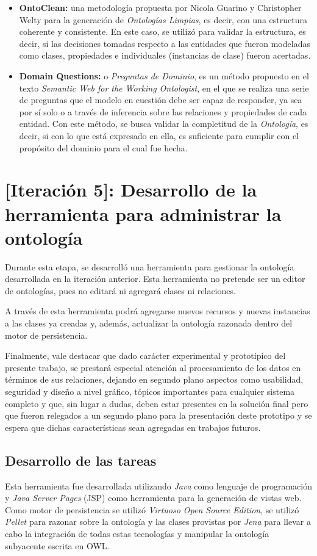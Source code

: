 \begin{itemize}
\begin{itemize}
    \item \textbf{OntoClean:} una metodología propuesta por Nicola Guarino y Christopher Welty para la generación de \textit{Ontologías Limpias}, es decir, con una estructura coherente y consistente. En este caso, se utilizó para validar la estructura, es decir, si las decisiones tomadas respecto a las entidades que fueron modeladas como clases, propiedades e individuales (instancias de clase) fueron acertadas.
    \item \textbf{Domain Questions:} o \textit{Preguntas de Dominio}, es un método propuesto en el texto \textit{Semantic Web for the Working Ontologist}, en el que se realiza una serie de preguntas que el modelo en cuestión debe ser capaz de responder, ya sea por sí solo o a través de inferencia sobre las relaciones y propiedades de cada entidad. Con este método, se busca validar la completitud de la \textit{Ontología}, es decir, si con lo que está expresado en ella, es suficiente para cumplir con el propósito del dominio para el cual fue hecha.
\end{itemize}

\section{[Iteración 5]: Desarrollo de la herramienta para administrar la ontología}
Durante esta etapa, se desarrolló una herramienta para gestionar la ontología desarrollada en la iteración anterior. Esta herramienta no pretende ser un editor de ontologías, pues no editará ni agregará clases ni relaciones.

A través de esta herramienta podrá agregarse nuevos recursos y nuevas instancias a las clases ya creadas y, además, actualizar la ontología razonada dentro del motor de persistencia. 

Finalmente, vale destacar que dado carácter experimental y prototípico del presente trabajo, se prestará especial atención al procesamiento de los datos en términos de sus relaciones, dejando en segundo plano aspectos como usabilidad, seguridad y diseño a nivel gráfico, tópicos importantes para cualquier sistema completo y que, sin lugar a dudas, deben estar presentes en la solución final pero que fueron relegados a un segundo plano para la presentación deste prototipo y se espera que dichas características sean agregadas en trabajos futuros.

\subsection{Desarrollo de las tareas}
Esta herramienta fue desarrollada utilizando \textit{Java} como lenguaje de programación y \textit{Java Server Pages} (JSP) como herramienta para la generación de vistas web. Como motor de persistencia se utilizó \textit{Virtuoso Open Source Edition}, se utilizó \textit{Pellet} para razonar sobre la ontología y las clases provistas por \textit{Jena} para llevar a cabo la integración de todas estas tecnologías y manipular la ontología subyacente escrita en OWL.


\end{itemize}
